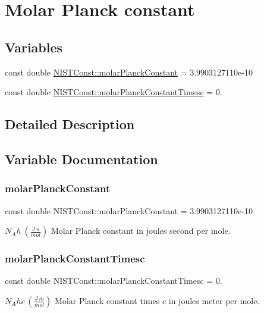\hypertarget{group___n_i_s_t_const-_molar_planck_constant}{}\section{Molar Planck constant}
\label{group___n_i_s_t_const-_molar_planck_constant}
\subsection*{Variables}
\begin{DoxyCompactItemize}
\item 
const double \hyperlink{group___n_i_s_t_const-_molar_planck_constant_gaf75c23aa4c9305b0670bc8162fa25b66}{N\+I\+S\+T\+Const\+::molar\+Planck\+Constant} = 3.\+9903127110e-\/10
\item 
const double \hyperlink{group___n_i_s_t_const-_molar_planck_constant_ga4ead25403deaa41d6f95b1252140b8b0}{N\+I\+S\+T\+Const\+::molar\+Planck\+Constant\+Timesc} = 0.
\end{DoxyCompactItemize}


\subsection{Detailed Description}


\subsection{Variable Documentation}
\mbox{\label{group___n_i_s_t_const-_molar_planck_constant_gaf75c23aa4c9305b0670bc8162fa25b66}} 
\subsubsection{\texorpdfstring{molar\+Planck\+Constant}{molarPlanckConstant}}
{\footnotesize\ttfamily const double N\+I\+S\+T\+Const\+::molar\+Planck\+Constant = 3.\+9903127110e-\/10}

$N_A h \ (\frac{J\ s}{mol})$ Molar Planck constant in joules second per mole. \mbox{\label{group___n_i_s_t_const-_molar_planck_constant_ga4ead25403deaa41d6f95b1252140b8b0}} 
\subsubsection{\texorpdfstring{molar\+Planck\+Constant\+Timesc}{molarPlanckConstantTimesc}}
{\footnotesize\ttfamily const double N\+I\+S\+T\+Const\+::molar\+Planck\+Constant\+Timesc = 0.}

$N_A hc \ (\frac{J\ m}{mol})$ Molar Planck constant times c in joules meter per mole. 